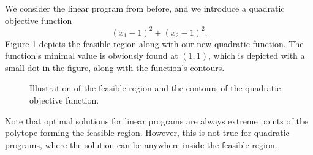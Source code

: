 We consider the linear program from before, and we introduce a quadratic
objective function
\[
(x_1 - 1)^2 + (x_2 - 1)^2.
\]
Figure \ref{fig:qpback} depicts the feasible region along with our new
quadratic function.
The function's minimal value is obviously found at $(1,1)$, which is
depicted with a small dot in the figure, along with the function's contours.
\begin{figure}[ht!]
\centering

\caption{Illustration of the feasible region and the contours of the quadratic
         objective function.}
\label{fig:qpback}
\end{figure}
Note that optimal solutions for linear programs are always extreme points
of the polytope forming the feasible region. However, this is not true
for quadratic programs, where the solution can be anywhere inside
the feasible region.
